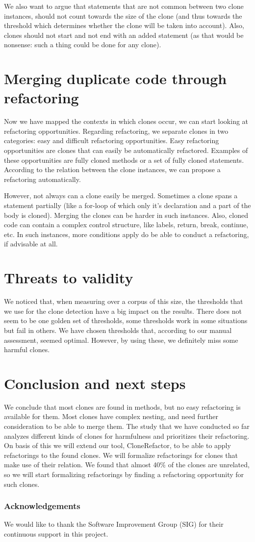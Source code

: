 \documentclass[a4paper]{article}
\begin{document}
We also want to argue that statements that are not common between two clone instances, should not count towards the size of the clone (and thus towards the threshold which determines whether the clone will be taken into account). Also, clones should not start and not end with an added statement (as that would be nonsense: such a thing could be done for any clone).

\section{Merging duplicate code through refactoring}
Now we have mapped the contexts in which clones occur, we can start looking at refactoring opportunities. Regarding refactoring, we separate clones in two categories: easy and difficult refactoring opportunities. Easy refactoring opportunities are clones that can easily be automatically refactored. Examples of these opportunities are fully cloned methods or a set of fully cloned statements. According to the relation between the clone instances, we can propose a refactoring automatically.

However, not always can a clone easily be merged. Sometimes a clone spans a statement partially (like a for-loop of which only it's declaration and a part of the body is cloned). Merging the clones can be harder in such instances. Also, cloned code can contain a complex control structure, like labels, return, break, continue, etc. In such instances, more conditions apply do be able to conduct a refactoring, if advisable at all.


\section{Threats to validity}
We noticed that, when measuring over a corpus of this size, the thresholds that we use for the clone detection have a big impact on the results. There does not seem to be one golden set of thresholds, some thresholds work in some situations but fail in others. We have chosen thresholds that, according to our manual assessment, seemed optimal. However, by using these, we definitely miss some harmful clones.

\section{Conclusion and next steps}
We conclude that most clones are found in methods, but no easy refactoring is available for them. Most clones have complex nesting, and need further consideration to be able to merge them. The study that we have conducted so far analyzes different kinds of clones for harmfulness and prioritizes their refactoring. On basis of this we will extend our tool, CloneRefactor, to be able to apply refactorings to the found clones. We will formalize refactorings for clones that make use of their relation. We found that almost 40\% of the clones are unrelated, so we will start formalizing refactorings by finding a refactoring opportunity for such clones.


\subsubsection{Acknowledgements}
We would like to thank the Software Improvement Group (SIG) for their continuous support in this project.



\end{document}
